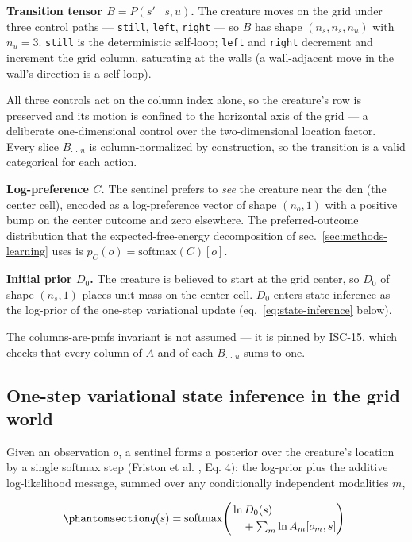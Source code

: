 \documentclass[
  english,
]{article}
\theoremstyle{plain}
\theoremstyle{definition}
\theoremstyle{remark}
\theoremstyle{definition}
\begin{document}
\textbf{Transition tensor \(B = P(s'\mid s, u)\).} The creature moves on
the grid under three control paths --- \texttt{still}, \texttt{left},
\texttt{right} --- so \(B\) has shape \((n_s, n_s, n_u)\) with
\(n_u = 3\). \texttt{still} is the deterministic self-loop;
\texttt{left} and \texttt{right} decrement and increment the grid
column, saturating at the walls (a wall-adjacent move in the wall's
direction is a self-loop).

All three controls act on the column index alone, so the creature's row
is preserved and its motion is confined to the horizontal axis of the
grid --- a deliberate one-dimensional control over the two-dimensional
location factor. Every slice \(B_{\cdot\,\cdot\,u}\) is
column-normalized by construction, so the transition is a valid
categorical for each action.

\textbf{Log-preference \(C\).} The sentinel prefers to \emph{see} the
creature near the den (the center cell), encoded as a log-preference
vector of shape \((n_o, 1)\) with a positive bump on the center outcome
and zero elsewhere. The preferred-outcome distribution that the
expected-free-energy decomposition of sec.~\ref{sec:methods-learning}
uses is \(p_C(o) = \mathrm{softmax}(C)[o]\).

\textbf{Initial prior \(D_0\).} The creature is believed to start at the
grid center, so \(D_0\) of shape \((n_s, 1)\) places unit mass on the
center cell. \(D_0\) enters state inference as the log-prior of the
one-step variational update (eq.~\ref{eq:state-inference} below).

The columns-are-pmfs invariant is not assumed --- it is pinned by
ISC-15, which checks that every column of \(A\) and of each
\(B_{\cdot\,\cdot\,u}\) sums to one.

\subsection{One-step variational state inference in the grid
world}\label{sec:methods-state-inference}

Given an observation \(o\), a sentinel forms a posterior over the
creature's location by a single softmax step (Friston et al.
\citeyearpar{friston2024federated}, Eq. 4): the log-prior plus the
additive log-likelihood message, summed over any conditionally
independent modalities \(m\),

\begin{equation}\protect\phantomsection\label{eq:state-inference}{q(s)
= \mathrm{softmax}\!\left(
\begin{aligned}
&\ln D_0(s)\\
&\quad + \textstyle\sum_m \ln A_m[o_m, s]
\end{aligned}
\right).}\end{equation}
\end{document}
